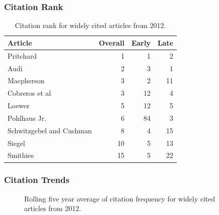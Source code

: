 \documentclass[
  10pt,
  letterpaper,
  DIV=11,
  numbers=noendperiod,
  twoside]{scrartcl}
\begin{document}
\subsubsection*{Citation Rank}\label{sec-rank-2012}

\begin{longtable}[]{@{}lrrr@{}}

\caption{\label{tbl-citation-rank-2012}Citation rank for widely cited
articles from 2012.}

\tabularnewline

\toprule\noalign{}
Article & Overall & Early & Late \\
\midrule\noalign{}
\endhead
\bottomrule\noalign{}
\endlastfoot
Pritchard & 1 & 1 & 2 \\
Audi & 2 & 3 & 1 \\
Macpherson & 3 & 2 & 11 \\
Cobreros et al & 3 & 12 & 4 \\
Loewer & 5 & 12 & 5 \\
Pohlhaus Jr. & 6 & 84 & 3 \\
Schwitzgebel and Cushman & 8 & 4 & 15 \\
Siegel & 10 & 5 & 13 \\
Smithies & 15 & 5 & 22 \\

\end{longtable}

\subsubsection*{Citation Trends}\label{sec-trends-2012}

\begin{figure}


\caption{\label{fig-citation-spaghetti-2012}Rolling five year average of
citation frequency for widely cited articles from 2012.}

\end{figure}%
\end{document}
